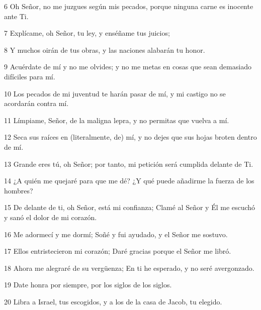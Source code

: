 \par 6 Oh Señor, no me juzgues según mis pecados, porque ninguna carne es inocente ante Ti.

\par 7 Explícame, oh Señor, tu ley, y enséñame tus juicios;

\par 8 Y muchos oirán de tus obras, y las naciones alabarán tu honor.

\par 9 Acuérdate de mí y no me olvides; y no me metas en cosas que sean demasiado difíciles para mí.

\par 10 Los pecados de mi juventud te harán pasar de mí, y mi castigo no se acordarán contra mí.

\par 11 Límpiame, Señor, de la maligna lepra, y no permitas que vuelva a mí.

\par 12 Seca sus raíces en (literalmente, de) mí, y no dejes que sus hojas broten dentro de mí.

\par 13 Grande eres tú, oh Señor; por tanto, mi petición será cumplida delante de Ti.

\par 14 ¿A quién me quejaré para que me dé? ¿Y qué puede añadirme la fuerza de los hombres?

\par 15 De delante de ti, oh Señor, está mi confianza; Clamé al Señor y Él me escuchó y sanó el dolor de mi corazón.

\par 16 Me adormecí y me dormí; Soñé y fui ayudado, y el Señor me sostuvo.

\par 17 Ellos entristecieron mi corazón; Daré gracias porque el Señor me libró.

\par 18 Ahora me alegraré de su vergüenza; En ti he esperado, y no seré avergonzado.

\par 19 Date honra por siempre, por los siglos de los siglos.

\par 20 Libra a Israel, tus escogidos, y a los de la casa de Jacob, tu elegido.


